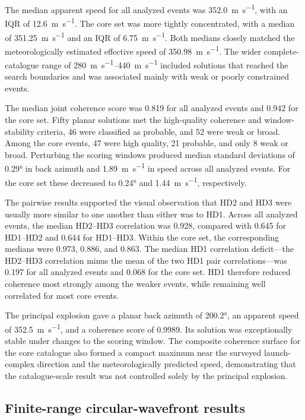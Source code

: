 \documentclass[12pt]{article}
\begin{document}
The median apparent speed for all analyzed events was
\SI{352.0}{\metre\per\second}, with an IQR of
\SI{12.6}{\metre\per\second}. The core set was more tightly concentrated, with
a median of \SI{351.25}{\metre\per\second} and an IQR of
\SI{6.75}{\metre\per\second}. Both medians closely matched the
meteorologically estimated effective speed of
\SI{350.98}{\metre\per\second}. The wider complete-catalogue range of
\SIrange{280}{440}{\metre\per\second} included solutions that reached the
search boundaries and was associated mainly with weak or poorly constrained
events.

The median joint coherence score was 0.819 for all analyzed events and 0.942 for
the core set. Fifty planar solutions met the high-quality coherence and
window-stability criteria, 46 were classified as probable, and 52 were weak or
broad. Among the core events, 47 were high quality, 21 probable, and only 8 weak
or broad. Perturbing the scoring windows produced median standard deviations of
\ang{0.29} in back azimuth and \SI{1.89}{\metre\per\second} in speed across all
analyzed events. For the core set these decreased to \ang{0.24} and
\SI{1.44}{\metre\per\second}, respectively.

The pairwise results supported the visual observation that HD2 and HD3 were
usually more similar to one another than either was to HD1. Across all analyzed
events, the median HD2--HD3 correlation was 0.928, compared with 0.645 for
HD1--HD2 and 0.644 for HD1--HD3. Within the core set, the corresponding medians
were 0.973, 0.886, and 0.863. The median HD1 correlation deficit---the HD2--HD3
correlation minus the mean of the two HD1 pair correlations---was 0.197 for all
analyzed events and 0.068 for the core set. HD1 therefore reduced coherence most
strongly among the weaker events, while remaining well correlated for most core
events.

The principal explosion gave a planar back azimuth of \ang{200.2}, an apparent
speed of \SI{352.5}{\metre\per\second}, and a coherence score of 0.9989. Its
solution was exceptionally stable under changes to the scoring window. The
composite coherence surface for the core catalogue also formed a compact maximum
near the surveyed launch-complex direction and the meteorologically predicted
speed, demonstrating that the catalogue-scale result was not controlled solely
by the principal explosion.

\subsection{Finite-range circular-wavefront results}
\end{document}
